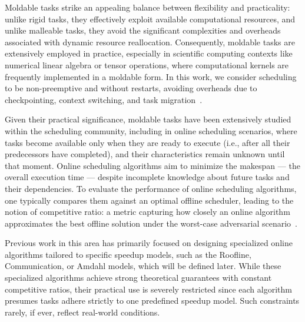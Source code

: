 \documentclass{article}
\begin{document}
Moldable tasks strike an appealing balance between flexibility and practicality: unlike rigid tasks, they effectively exploit available computational resources, and unlike malleable tasks, they avoid the significant complexities and overheads associated with dynamic resource reallocation. Consequently, moldable tasks are extensively employed in practice, especially in scientific computing contexts like numerical linear algebra or tensor operations, where computational kernels are frequently implemented in a moldable form. In this work, we consider scheduling to be non-preemptive and without restarts, avoiding overheads due to checkpointing, context switching, and task migration~\cite{Feldmann98_DAG}.

Given their practical significance, moldable tasks have been extensively studied within the scheduling community, including in online scheduling scenarios, where tasks become available only when they are ready to execute (i.e., after all their predecessors have completed), and their characteristics remain unknown until that moment. Online scheduling algorithms aim to minimize the makespan — the overall execution time — despite incomplete knowledge about future tasks and their dependencies. To evaluate the performance of online scheduling algorithms, one typically compares them against an optimal offline scheduler, leading to the notion of competitive ratio: a metric capturing how closely an online algorithm approximates the best offline solution under the worst-case adversarial scenario~\cite{Sleator1985}.

Previous work \cite{ICPP22,TOPC24} in this area has primarily focused on designing specialized online algorithms tailored to specific speedup models, such as the Roofline, Communication, or Amdahl models, which will be defined later. While these specialized algorithms achieve strong theoretical guarantees with constant competitive ratios, their practical use is severely restricted since each algorithm presumes tasks adhere strictly to one predefined speedup model. Such constraints rarely, if ever, reflect real-world conditions.
\end{document}
